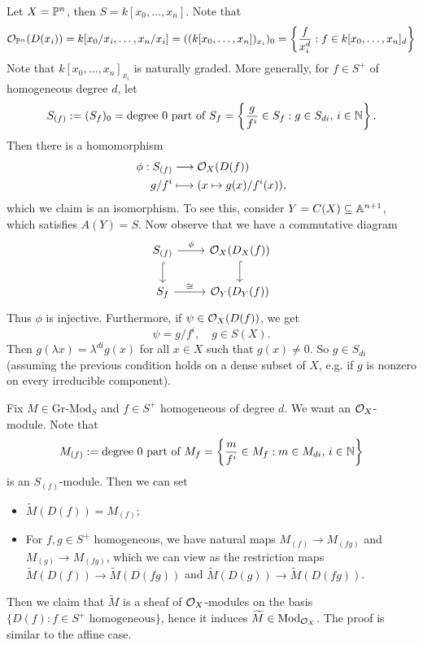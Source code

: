 \begin{example}
  Let $X = \mathbb{P}^n$, then $S = k[x_0, \dots, x_n]$.
  Note that
  \[
    \mathcal{O}_{\mathbb{P}^n}(D(x_i))
    = k[x_0 / x_i, \dots, x_n / x_i]
    = ((k[x_0, \dots, x_n])_{x_i})_0
    = \left\{
      \frac{f}{x_i^d} : f \in k[x_0, \dots, x_n]_d
    \right\}
  \]
  Note that $k[x_0, \dots, x_n]_{x_i}$
  is naturally graded. More generally,
  for $f \in S^+$ of homogeneous
  degree $d$, let
  \[
    S_{(f)}
    := (S_f)_0
    = \text{degree $0$ part of $S_f$}
    = \left\{
      \frac{g}{f^i} \in S_f : g \in S_{di},\,
      i \in \mathbb{N}
    \right\}.
  \]
  Then there is a homomorphism
  \begin{align*}
    \phi : S_{(f)} &\longrightarrow \mathcal{O}_X(D(f)) \\
    g / f^i &\longmapsto (x \mapsto g(x) / f^i(x)),
  \end{align*}
  which we claim is an isomorphism.
  To see this, consider $Y = C(X) \subseteq \mathbb{A}^{n + 1}$, which
  satisfies $A(Y) = S$.
  Now observe that we have a commutative
  diagram
  \[
    \begin{tikzcd}
      S_{(f)} \ar[r, "\phi"] \ar[d, hook] & \OO_X(D_X(f)) \ar[d, hook] \\
      S_f \ar[r, "\cong"] & \OO_Y(D_Y(f))
    \end{tikzcd}
  \]
  Thus $\phi$ is injective. Furthermore,
  if $\psi \in \mathcal{O}_X(D(f))$, we get
  \[
    \psi = g / f^i, \quad g \in S(X).
  \]
  Then $g(\lambda x) = \lambda^{d i} g(x)$
  for all $x \in X$ such that $g(x) \ne 0$.
  So $g \in S_{di}$ (assuming the previous
  condition holds on a dense subset of
  $X$, e.g. if $g$ is nonzero on every
  irreducible component).
\end{example}

\begin{remark}
  Fix $M \in \mathrm{Gr}\text{-}\mathrm{Mod}_S$
  and $f \in S^+$ homogeneous of degree $d$.
  We want an $\mathcal{O}_X$-module. Note that
  \[
    M_{(f)}
    := \text{degree $0$ part of $M_f$}
    = \left\{
      \frac{m}{f^i} \in M_f : m \in M_{di},\,
      i \in \mathbb{N}
    \right\}
  \]
  is an $S_{(f)}$-module. Then we can set
  \begin{itemize}
    \item $\widetilde{M}(D(f)) = M_{(f)}$;
    \item For $f, g \in S^+$ homogeneous,
      we have natural maps
      $M_{(f)} \to M_{(fg)}$ and $M_{(g)} \to M_{(fg)}$,
      which we can view as the restriction
      maps
      $\widetilde{M}(D(f)) \to \widetilde{M}(D(fg))$ and
      $\widetilde{M}(D(g)) \to \widetilde{M}(D(fg))$.
  \end{itemize}
\end{remark}
Then we claim
that $\widetilde{M}$ is a
sheaf of $\mathcal{O}_X$-modules on the
basis $\{D(f) : f \in S^+ \text{ homogeneous}\}$,
hence it induces $\widetilde{M} \in \mathrm{Mod}_{\mathcal{O}_X}$. The
proof is similar to the affine case.

